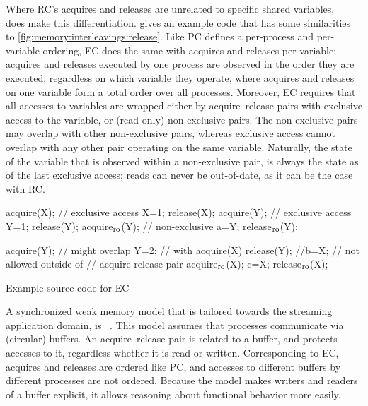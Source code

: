 Where \ac{RC}'s acquires and releases are unrelated to specific shared variables, ~\cite{bershad:midway} does make this differentiation.
 gives an example code that has some similarities to \cref{fig:memory:interleavings:release}.
Like \ac{PC} defines a per-process and per-variable ordering, \ac{EC} does the same with acquires and releases per variable; acquires and releases executed by one process are observed in the order they are executed, regardless on which variable they operate, where acquires and releases on one variable form a total order over all processes.
Moreover, \ac{EC} requires that all accesses to variables are wrapped either by acquire--release pairs with exclusive access to the variable, or (read-only) non-exclusive pairs.
The non-exclusive pairs may overlap with other non-exclusive pairs, whereas exclusive access cannot overlap with any other pair operating on the same variable.
Naturally, the state of the variable that is observed within a non-exclusive pair, is always the state as of the last exclusive access; reads can never be out-of-date, as it can be the case with \ac{RC}.

\begin{parcodes}%
\begin{parcol}{.45\linewidth}%
\begin{parcode}{\linewidth}%
\begin{lstcode}[variable={X,Y,a}]
acquire(X); // exclusive access
X=1;
release(X);
acquire(Y); // exclusive access
Y=1;
release(Y);
acquire$\textsubscript{ro}$(Y); // non-exclusive
a=Y;
release$\textsubscript{ro}$(Y);
\end{lstcode}%
\end{parcode}%
\end{parcol}%
\begin{parcol}{.45\linewidth}%
\begin{parcode}{\linewidth}%
\begin{lstcode}[variable={X,Y,b,c}]
acquire(Y); // might overlap
Y=2;        //  with acquire(X)
release(Y);
//b=X; // not allowed outside of
       //  acquire-release pair
acquire$\textsubscript{ro}$(X);
c=X;
release$\textsubscript{ro}$(X);
\end{lstcode}%
\end{parcode}%
\end{parcol}%
\caption{Example source code for \acl{EC}}%
\label{fig:memory:interleavings:entry}%
\end{parcodes}

A synchronized weak memory model that is tailored towards the streaming application domain, is ~\cite{brand:streaming_consistency}.
This model assumes that processes communicate via (circular) buffers.
An acquire--release pair is related to a buffer, and protects accesses to it, regardless whether it is read or written.
Corresponding to \ac{EC}, acquires and releases are ordered like \ac{PC}, and accesses to different buffers by different processes are not ordered.
Because the model makes writers and readers of a buffer explicit, it allows reasoning about functional behavior more easily.

